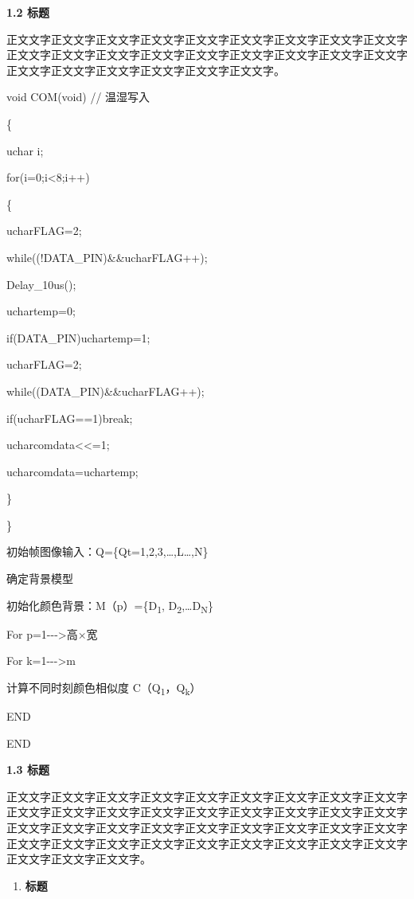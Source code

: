 \documentclass[
]{article}
\begin{document}
\protect{}\label{_Toc22971}{}\textbf{1.2 标题}

正文文字正文文字正文文字正文文字正文文字正文文字正文文字正文文字正文文字正文文字正文文字正文文字正文文字正文文字正文文字正文文字正文文字正文文字正文文字正文文字正文文字正文文字正文文字正文文字。

void COM(void) // 温湿写入

\{

uchar i;

for(i=0;i\textless8;i++)

\{

ucharFLAG=2;

while((!DATA\_PIN)\&\&ucharFLAG++);

Delay\_10us();

uchartemp=0;

if(DATA\_PIN)uchartemp=1;

ucharFLAG=2;

while((DATA\_PIN)\&\&ucharFLAG++);

if(ucharFLAG==1)break;

ucharcomdata\textless\textless=1;

ucharcomdata\textbar=uchartemp;

\}

\}

\protect{}\label{_Toc7083}{}初始帧图像输入：Q=\{Q\textbar t=1,2,3,\ldots,L\ldots,N\}

确定背景模型

初始化颜色背景：M（p）=\{D\textsubscript{1},
D\textsubscript{2},\ldots D\textsubscript{N}\}

For p=1-\/-\/-\textgreater 高×宽

For k=1-\/-\/-\textgreater m

计算不同时刻颜色相似度 C（Q\textsubscript{1}，Q\textsubscript{k}）

END

END

\textbf{1.3 标题}

正文文字正文文字正文文字正文文字正文文字正文文字正文文字正文文字正文文字正文文字正文文字正文文字正文文字正文文字正文文字正文文字正文文字正文文字正文文字正文文字正文文字正文文字正文文字正文文字正文文字正文文字正文文字正文文字正文文字正文文字正文文字正文文字正文文字正文文字正文文字正文文字正文文字正文文字正文文字。

\begin{enumerate}
\def\labelenumi{\arabic{enumi}.}
\setcounter{enumi}{1}
\item
  \textbf{\hfill\break
  }\protect{}\label{_Toc31455}{}\textbf{标题}
\end{enumerate}
\end{document}

